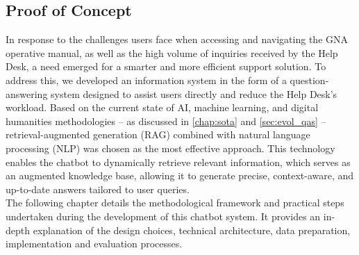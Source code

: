 \begin{spacing}{1.5}
\section{Proof of Concept}
In response to the challenges users face when accessing and navigating the GNA operative manual, as well as the high volume of inquiries received by the Help Desk, a need emerged for a smarter and more efficient support solution. To address this, we developed an information system in the form of a question-answering system designed to assist users directly and reduce the Help Desk’s workload. Based on the current state of AI, machine learning, and digital humanities methodologies -- as discussed in \autoref{chap:sota} and \autoref{sec:evol_qas} -- retrieval-augmented generation (RAG) combined with natural language processing (NLP) was chosen as the most effective approach. This technology enables the chatbot to dynamically retrieve relevant information, which serves as an augmented knowledge base, allowing it to generate precise, context-aware, and up-to-date answers tailored to user queries.
\\

The following chapter details the methodological framework and practical steps undertaken during the development of this chatbot system. It provides an in-depth explanation of the design choices, technical architecture, data preparation, implementation and evaluation processes.


\end{spacing}
